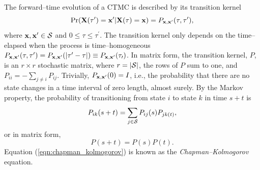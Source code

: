 The forward--time evolution of a CTMC is described by its transition kernel $$\Pr(\mathbf{X}(\tau^\prime) = \mathbf{x}^\prime | \mathbf{X}(\tau) = \mathbf{x}) = P_{\mathbf{x},\mathbf{x}^\prime}(\tau,\tau^\prime),$$
where $ \mathbf{x},\mathbf{x}^\prime\in\mathcal{S} $ and $ 0\leq\tau\leq\tau^\prime $. The transition kernel only depends on the time--elapsed when the process is time--homogeneous $ P_{\mathbf{x},\mathbf{x}^\prime}(\tau,\tau^\prime) = P_{\mathbf{x},\mathbf{x}^\prime}(|\tau^\prime - \tau|) \equiv P_{\mathbf{x},\mathbf{x}^\prime}(\tau_\prime) $. In matrix form, the transition kernel, $ P $, is an $ r\times r $ stochastic matrix, where $ r = |\mathcal{S}| $, the rows of $ P $ sum to one, and $ P_{ii} = -\sum_{j\neq i}P_{ij}$. Trivially, $ P_{\mathbf{x},\mathbf{x}^\prime}(0) = I $, i.e., the probability that there are no state changes in a time interval of zero length, almost surely. By the Markov property, the probability of transitioning from state $ i $ to state $ k $ in time $ s+t $ is 
\begin{equation}
\label{eqn:chapman_kolmogorov}
P_{ik}(s+t) = \sum_{j\in\mathcal{S}}P_{ij}(s)P_{jk(t)},
\end{equation}
or in matrix form, $$P(s+t) = P(s)P(t).$$
Equation (\ref{eqn:chapman_kolmogorov}) is known as the \textit{Chapman--Kolmogorov} equation. 


